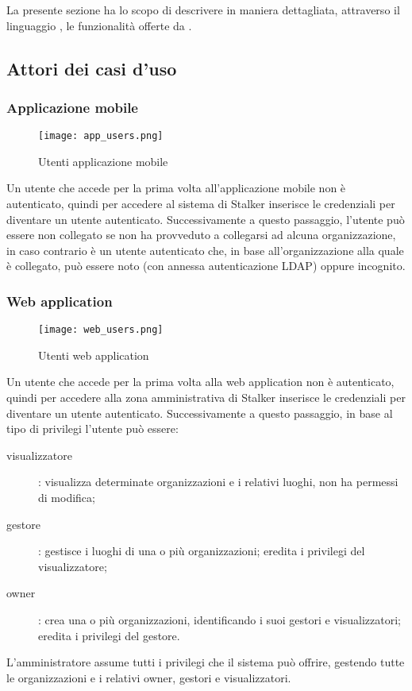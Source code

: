 \documentclass[../analisi-dei-requisiti.tex]{subfiles}
\begin{document}
La presente sezione ha lo scopo di descrivere in maniera dettagliata, attraverso il linguaggio , le funzionalità offerte da .

\subsection{Attori dei casi d'uso}%
\label{sub:attori_casi_duso}

\subsubsection{Applicazione mobile}%
\label{subs:mobile_app}

\begin{figure}[H]
  \centering
  \texttt{[image: app\_users.png]}
  \caption{Utenti applicazione mobile}%
  \label{fig:usersapp}
\end{figure}

Un utente che accede per la prima volta all'applicazione mobile non è autenticato, quindi per accedere al sistema di Stalker inserisce le
credenziali per diventare un utente autenticato.
Successivamente a questo passaggio, l'utente può essere non collegato se non ha provveduto a collegarsi ad alcuna organizzazione, in caso contrario
è un utente autenticato che, in base all'organizzazione alla quale è collegato, può essere noto (con annessa autenticazione LDAP) oppure incognito.

\subsubsection{Web application}%
\label{subs:web_application}

\begin{figure}[H]
  \centering
  \texttt{[image: web\_users.png]}
  \caption{Utenti web application}%
  \label{fig:usersweb}
\end{figure}

Un utente che accede per la prima volta alla web application non è autenticato, quindi per accedere alla zona amministrativa di Stalker inserisce le
credenziali per diventare un utente autenticato.
Successivamente a questo passaggio, in base al tipo di privilegi l'utente può essere:
\begin{description}
  \item[visualizzatore]: visualizza determinate organizzazioni e i relativi luoghi, non ha permessi di modifica;
  \item[gestore]: gestisce i luoghi di una o più organizzazioni; eredita i privilegi del visualizzatore;
  \item[owner]: crea una o più organizzazioni, identificando i suoi gestori e visualizzatori; eredita i privilegi del gestore.
\end{description}
L'amministratore assume tutti i privilegi che il sistema può offrire, gestendo tutte le organizzazioni e i relativi owner, gestori e visualizzatori.
\end{document}
